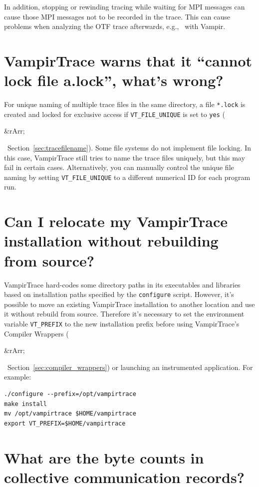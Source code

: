 \documentclass[a4paper,twoside,12pt,BCOR12mm]{scrbook}
\newcommand{\rarr}{$\Rightarrow$}  %
\renewcommand{\rarr}{\begin{rawhtml}&rArr;\end{rawhtml}}   %
\begin{document}
\begin{latexonly}
In addition, stopping or rewinding tracing while waiting for MPI messages can cause those MPI messages not to
be recorded in the trace. This can cause problems when analyzing the OTF trace afterwards, e.g.,~ with Vampir.


\section{VampirTrace warns that it ``cannot lock file a.lock'', what's wrong?}
\label{sec:faq_filelock}

For unique naming of multiple trace files in the same directory, a file \texttt{*.lock}
is created and locked for exclusive access if \texttt{VT\_FILE\_UNIQUE}
is set to \texttt{yes} (\rarr ~Section~\ref{sec:tracefilename}).
Some file systems do not implement file locking.
In this case, VampirTrace still tries to name the trace files uniquely, but this may fail
in certain cases.
Alternatively, you can manually control the unique file naming by setting 
\texttt{VT\_FILE\_UNIQUE} to a different numerical ID for each program run.

\section[Can I relocate my VampirTrace installation?]{Can I relocate my VampirTrace installation without rebuilding from source?}
\label{sec:faq_relocate}

VampirTrace hard-codes some directory paths in its executables and libraries based on installation
paths specified by the \texttt{configure} script. However, it's possible to move an existing VampirTrace
installation to another location and use it without rebuild from source.
Therefore it's necessary to set the environment variable \texttt{VT\_PREFIX} to the new installation prefix
before using VampirTrace's Compiler Wrappers (\rarr ~Section~\ref{sec:compiler_wrappers}) or launching an
instrumented application. For example:

\begin{verbatim}
./configure --prefix=/opt/vampirtrace
make install
mv /opt/vampirtrace $HOME/vampirtrace
export VT_PREFIX=$HOME/vampirtrace
\end{verbatim}

\section{What are the byte counts in collective communication records?}
\label{sec:faq_collective_bytes}


\end{latexonly}
\end{document}
